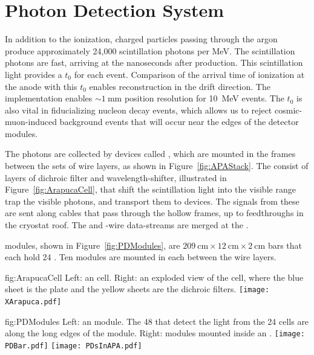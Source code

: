 \section{Photon Detection System}
\label{sec:fdsp-exec-pds}

In addition to the ionization, charged particles passing through the argon produce approximately 24,000 scintillation photons per \si{\mega\electronvolt}. The scintillation photons are fast, arriving at the  nanoseconds after production. This scintillation light provides a $t_{0}$ for each event. Comparison of the arrival time of ionization at the anode with this $t_{0}$ enables reconstruction in the drift direction. 
The  implementation enables $\sim\!\SI{1}{\mm}$ position resolution for \SI{10}{\mega\electronvolt}  events. The  $t_{0}$ is also vital in fiducializing nucleon decay events, which allows us to reject cosmic-muon-induced background events that will occur near the edges of the detector modules.

The photons are collected by devices called , which are mounted in the  frames between the sets of wire layers, as shown in Figure~\ref{fig:APAStack}. 
The  %
consist of layers of dichroic filter and wavelength-shifter, illustrated in Figure~\ref{fig:ArapucaCell}, that shift the  scintillation light into the visible range  trap  the visible photons, %
and transport them to  devices. The signals from these  are sent along cables that pass through the hollow  frames, up to feedthroughs in the cryostat roof. The  and -wire data-streams are merged at the . 

 modules, shown in Figure~\ref{fig:PDModules}, are 
$\SI{209}{\cm}\times\SI{12}{\cm}\times\SI{2}{\cm}$ bars that each hold 24 . 
Ten   modules  are mounted in each  between the wire layers. 

\begin{dunefigure}{fig:ArapucaCell}
{Left: an  cell. Right: an exploded view of the  cell, where the blue sheet is the  plate and the yellow sheets are the dichroic filters.}
\texttt{[image: XArapuca.pdf]}
\end{dunefigure}

\begin{dunefigure}{fig:PDModules}
{Left: an   module. The 48  that detect the light from the 24 cells are along the long edges of the module. Right:   modules mounted inside an .}
\texttt{[image: PDBar.pdf]}
\texttt{[image: PDsInAPA.pdf]}
\end{dunefigure}


